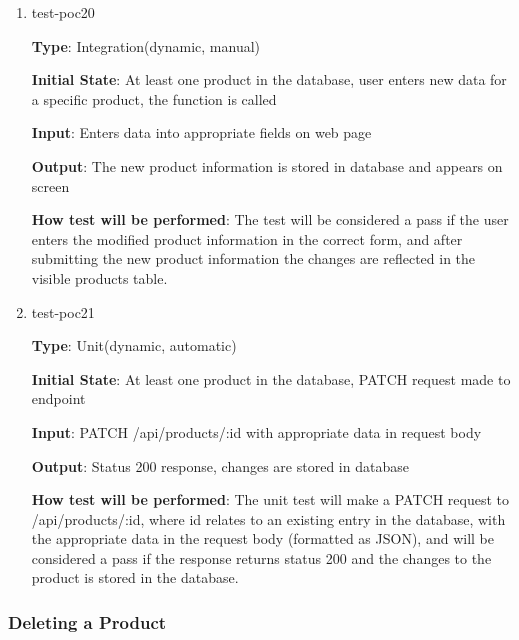 \documentclass[12pt, titlepage]{article}
\begin{document}
\begin{enumerate}
\item{test-poc20\\}

\textbf{Type}: Integration(dynamic, manual)

\textbf{Initial State}: At least one product in the database, user enters new data for a specific product, the function is called

\textbf{Input}: Enters data into appropriate fields on web page

\textbf{Output}: The new product information is stored in database and appears on screen

\textbf{How test will be performed}: The test will be considered a pass if the user enters the modified product information in the correct form, and after submitting the new product information the changes are reflected in the visible products table.

\item{test-poc21\\}

\textbf{Type}: Unit(dynamic, automatic)

\textbf{Initial State}: At least one product in the database, PATCH request made to endpoint

\textbf{Input}: PATCH /api/products/:id with appropriate data in request body

\textbf{Output}: Status 200 response, changes are stored in database

\textbf{How test will be performed}: The unit test will make a PATCH request to /api/products/:id, where id relates to an existing entry in the database, with the appropriate data in the request body (formatted as JSON), and will be considered a pass if the response returns status 200 and the changes to the product is stored in the database.
\end{enumerate}

\subsubsection{Deleting a Product}
\end{document}
